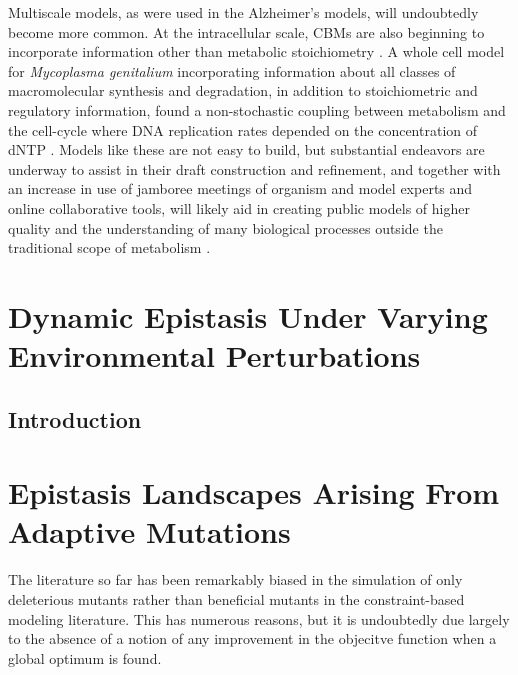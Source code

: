 \documentclass[phd,tocprelim]{cornell}
\newcommand*{\commonDir}{../common/}   %
\begin{document}
Multiscale models, as were used in the Alzheimer’s models, will
undoubtedly become more common. At the intracellular scale, CBMs are
also beginning to incorporate information other than metabolic
stoichiometry \citep{Lerman2012, Karr2012, Yizhak2010}. 
A whole cell model for \textit{Mycoplasma genitalium}
incorporating information about all classes of macromolecular
synthesis and degradation, in addition to stoichiometric and
regulatory information, found a non-stochastic coupling between
metabolism and the cell-cycle where DNA replication rates depended on
the concentration of dNTP \citep{Karr2012}. Models like these are not easy to build,
but substantial endeavors are underway to assist in their draft
construction and refinement, and together with an increase in use of
jamboree meetings of organism and model experts and online
collaborative tools, will likely aid in creating public models of
higher quality and the understanding of many biological processes
outside the traditional scope of metabolism \citep{Aziz2012,
Thiele2013, Herrgard2008, Karr2013, kbase2013, Pabinger2011,
Helikar2012}.


%

\chapter{Dynamic Epistasis Under Varying Environmental Perturbations}

\section{Introduction}
\epiSameGeneAbstract



\chapter{Epistasis Landscapes Arising From Adaptive Mutations}
The literature so far has been remarkably biased in the simulation of only
deleterious mutants rather than beneficial mutants in the constraint-based modeling
literature. This has numerous reasons, but it is undoubtedly due largely to 
the absence of a notion of any improvement in the objecitve function when a global optimum
is found. 
\end{document}
